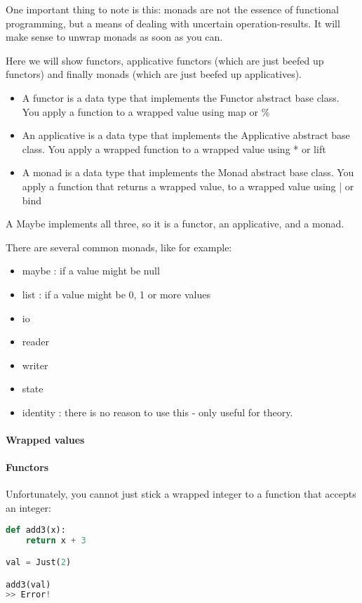 One important thing to note is this: monads are not the essence of functional programming, but a means of dealing with uncertain operation-results. It will make sense to unwrap monads as soon as you can.


Here we will show functors, applicative functors (which are just beefed up functors) and finally monads (which are just beefed up applicatives). 

\begin{itemize}
    \item A functor is a data type that implements the Functor abstract base class. You apply a function to a wrapped value using map or \% 
    \item An applicative is a data type that implements the Applicative abstract base class. You apply a wrapped function to a wrapped value using * or lift
    \item A monad is a data type that implements the Monad abstract base class.  You apply a function that returns a wrapped value, to a wrapped value using | or bind
\end{itemize}

A Maybe implements all three, so it is a functor, an applicative, and a monad.

There are several common monads, like for example: 

\begin{itemize}
    \item maybe : if a value might be null
    \item list : if a value might be 0, 1 or more values
    \item io
    \item reader
    \item writer
    \item state
    \item identity : there is no reason to use this - only useful for theory.
\end{itemize}

\paragraph{Wrapped values}

\paragraph{Functors} Unfortunately, you cannot just stick a wrapped integer to a function that accepts an integer: 
\begin{lstlisting}[language=python]
def add3(x):
    return x + 3

val = Just(2)

add3(val) 
>> Error!
\end{lstlisting}

